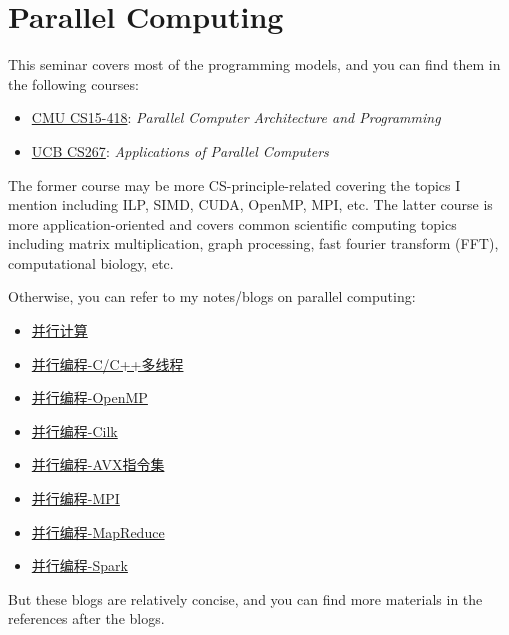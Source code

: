 \documentclass[english]{../TexTemplate/thesis}
\begin{document}
\section{Parallel Computing}
\label{sec:parallel}
This seminar covers most of the programming models, and you can find them in the following courses:
\begin{itemize}
	\item \href{http://www.cs.cmu.edu/~418/}{CMU CS15-418}: \emph{Parallel Computer Architecture and Programming}
	\item \href{https://sites.google.com/lbl.gov/cs267-spr2020/}{UCB CS267}: \emph{Applications of Parallel Computers}
\end{itemize}
The former course may be more CS-principle-related covering the topics I mention including ILP, SIMD, CUDA, OpenMP, MPI, etc.
The latter course is more application-oriented and covers common scientific computing topics including matrix multiplication, graph processing, fast fourier transform (FFT), computational biology, etc.

Otherwise, you can refer to my notes/blogs on parallel computing:
\begin{itemize}
	\item \href{https://chhzh123.github.io/summary/parallel-computing/}{并行计算}
	\item \href{https://chhzh123.github.io/blogs/2019-03-14-cpp-multithreading/}{并行编程-C/C++多线程}
	\item \href{https://chhzh123.github.io/summary/parallel-computing/openmp/}{并行编程-OpenMP}
	\item \href{https://chhzh123.github.io/summary/parallel-computing/cilk/}{并行编程-Cilk}
	\item \href{https://chhzh123.github.io/blogs/2019-03-03-AVX/}{并行编程-AVX指令集}
	\item \href{https://chhzh123.github.io/summary/parallel-computing/mpi/}{并行编程-MPI}
	\item \href{https://chhzh123.github.io/summary/parallel-computing/mapreduce/}{并行编程-MapReduce}
	\item \href{https://chhzh123.github.io/summary/parallel-computing/spark/}{并行编程-Spark}
\end{itemize}
But these blogs are relatively concise, and you can find more materials in the references after the blogs.
\end{document}
